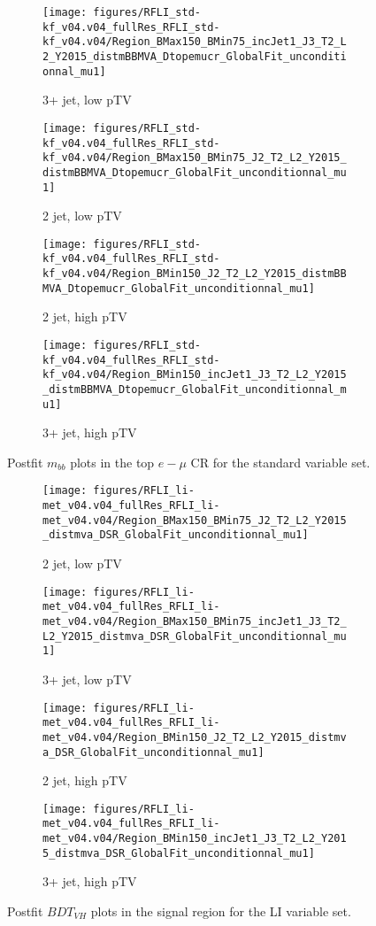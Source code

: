 \begin{figure}[!htbp]\captionsetup{justification=centering}
    \centering
\begin{subfigure}[t]{0.45000\textwidth}\centering\texttt{[image: figures/RFLI\_std-kf\_v04.v04\_fullRes\_RFLI\_std-kf\_v04.v04/Region\_BMax150\_BMin75\_incJet1\_J3\_T2\_L2\_Y2015\_distmBBMVA\_Dtopemucr\_GlobalFit\_unconditionnal\_mu1]}\caption{3+ jet, low pTV}\end{subfigure}
\begin{subfigure}[t]{0.45000\textwidth}\centering\texttt{[image: figures/RFLI\_std-kf\_v04.v04\_fullRes\_RFLI\_std-kf\_v04.v04/Region\_BMax150\_BMin75\_J2\_T2\_L2\_Y2015\_distmBBMVA\_Dtopemucr\_GlobalFit\_unconditionnal\_mu1]}\caption{2 jet, low pTV}\end{subfigure}
\begin{subfigure}[t]{0.45000\textwidth}\centering\texttt{[image: figures/RFLI\_std-kf\_v04.v04\_fullRes\_RFLI\_std-kf\_v04.v04/Region\_BMin150\_J2\_T2\_L2\_Y2015\_distmBBMVA\_Dtopemucr\_GlobalFit\_unconditionnal\_mu1]}\caption{2 jet, high pTV}\end{subfigure}
\begin{subfigure}[t]{0.45000\textwidth}\centering\texttt{[image: figures/RFLI\_std-kf\_v04.v04\_fullRes\_RFLI\_std-kf\_v04.v04/Region\_BMin150\_incJet1\_J3\_T2\_L2\_Y2015\_distmBBMVA\_Dtopemucr\_GlobalFit\_unconditionnal\_mu1]}\caption{3+ jet, high pTV}\end{subfigure}
  \caption{Postfit $m_{bb}$ plots in the top $e-\mu$ CR for the standard variable set.}
  \label{fig:stdPostfittopemu}
\end{figure}

\begin{figure}[!htbp]\captionsetup{justification=centering}
  \centering
\begin{subfigure}[t]{0.45000\textwidth}\centering\texttt{[image: figures/RFLI\_li-met\_v04.v04\_fullRes\_RFLI\_li-met\_v04.v04/Region\_BMax150\_BMin75\_J2\_T2\_L2\_Y2015\_distmva\_DSR\_GlobalFit\_unconditionnal\_mu1]}\caption{2 jet, low pTV}\end{subfigure}
\begin{subfigure}[t]{0.45000\textwidth}\centering\texttt{[image: figures/RFLI\_li-met\_v04.v04\_fullRes\_RFLI\_li-met\_v04.v04/Region\_BMax150\_BMin75\_incJet1\_J3\_T2\_L2\_Y2015\_distmva\_DSR\_GlobalFit\_unconditionnal\_mu1]}\caption{3+ jet, low pTV}\end{subfigure}
\begin{subfigure}[t]{0.45000\textwidth}\centering\texttt{[image: figures/RFLI\_li-met\_v04.v04\_fullRes\_RFLI\_li-met\_v04.v04/Region\_BMin150\_J2\_T2\_L2\_Y2015\_distmva\_DSR\_GlobalFit\_unconditionnal\_mu1]}\caption{2 jet, high pTV}\end{subfigure}
\begin{subfigure}[t]{0.45000\textwidth}\centering\texttt{[image: figures/RFLI\_li-met\_v04.v04\_fullRes\_RFLI\_li-met\_v04.v04/Region\_BMin150\_incJet1\_J3\_T2\_L2\_Y2015\_distmva\_DSR\_GlobalFit\_unconditionnal\_mu1]}\caption{3+ jet, high pTV}\end{subfigure}
  \caption{Postfit $BDT_{VH}$ plots in the signal region for the LI variable set.}
  \label{fig:LIPostfitmva}
\end{figure}


